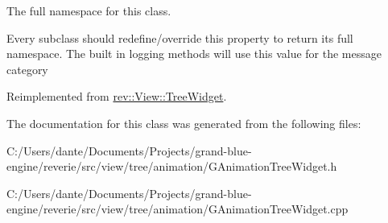 The full namespace for this class. 

Every subclass should redefine/override this property to return its full namespace. The built in logging methods will use this value for the message category 

Reimplemented from \mbox{\hyperlink{classrev_1_1_view_1_1_tree_widget_a09be824e34e50e9622c3dc333c9a3c07}{rev\+::\+View\+::\+Tree\+Widget}}.



The documentation for this class was generated from the following files\+:\begin{DoxyCompactItemize}
\item 
C\+:/\+Users/dante/\+Documents/\+Projects/grand-\/blue-\/engine/reverie/src/view/tree/animation/G\+Animation\+Tree\+Widget.\+h\item 
C\+:/\+Users/dante/\+Documents/\+Projects/grand-\/blue-\/engine/reverie/src/view/tree/animation/G\+Animation\+Tree\+Widget.\+cpp\end{DoxyCompactItemize}
